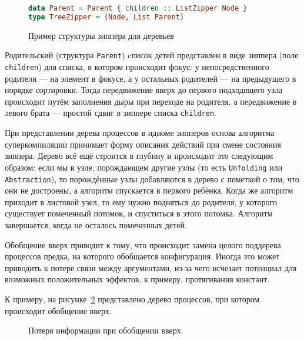 \begin{figure}[h!]
\begin{lstlisting}[mathescape,language=Haskell,extendedchars=\true,frame=single,basicstyle=\ttfamily]
data Parent = Parent { children :: ListZipper Node }
type TreeZipper = (Node, List Parent)
\end{lstlisting}
\caption{Пример структуры зиппера для деревьев}
\label{fig:zipper}
\end{figure}

Родительский (структура \lstinline{Parent}) cписок детей представлен в виде зиппера (поле \lstinline{children})
для списка, в котором происходит фокус: у непосредственного родителя --- на элемент в фокусе, а у остальных
родителей --- на предыдущего в порядке сортировки.
Тогда передвижение вверх до первого подходящего узла происходит путём
заполнения дыры при переходе на родителя, а передвижение в левого брата ---
простой сдвиг в зиппере списка \lstinline{children}.

При представлении дерева процессов в идиоме зипперов основа алгоритма
суперкомпиляции принимает форму описания действий при смене состояния зиппера.
Дерево всё ещё строится в глубину и происходит это следующим образом:
если мы в узле, порождающем другие узлы (то есть \lstinline{Unfolding}
или \lstinline{Abstraction}), то порождённые узлы добавляются в дерево
с пометкой о том, что они не достроены, а алгоритм спускается в первого
ребёнка. Когда же алгоритм приходит в листовой узел, то ему нужно подняться
до родителя, у которого существует помеченный потомок, и спуститься в этого
потомка. Алгоритм завершается, когда не осталось помеченных детей.

Обобщение вверх приводит к тому, что происходит замена целого поддерева процессов
предка, на которого обобщается конфигурация. Иногда это может приводить к потере
связи между аргументами, из-за чего исчезает потенциал для возможных
положительных эффектов, к примеру, протягивания констант.

К примеру, на рисунке~\ref{fig:genup} представлено дерево процессов, при котором происходит обобщение вверх.

\begin{figure}[h!]
\center
{}
\caption{Потеря информации при обобщении вверх.}
\label{fig:genup}
\end{figure}

